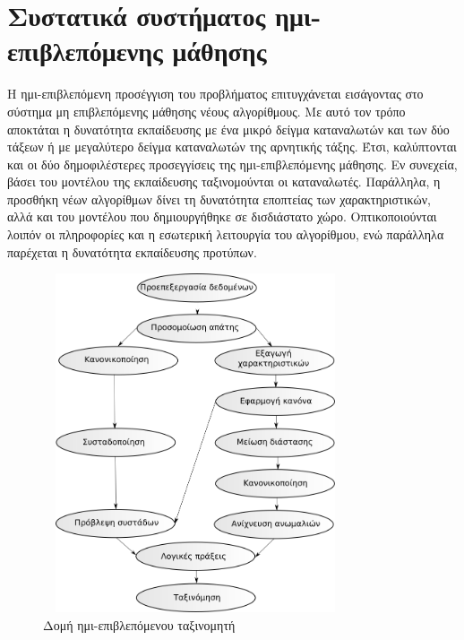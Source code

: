 \section{Συστατικά συστήματος ημι-επιβλεπόμενης μάθησης}
Η ημι-επιβλεπόμενη προσέγγιση του προβλήματος επιτυγχάνεται εισάγοντας στο σύστημα μη επιβλεπόμενης μάθησης νέους αλγορίθμους. Με αυτό τον τρόπο αποκτάται η δυνατότητα εκπαίδευσης με ένα μικρό δείγμα καταναλωτών και των δύο τάξεων ή με μεγαλύτερο δείγμα καταναλωτών της αρνητικής τάξης. Έτσι, καλύπτονται και οι δύο δημοφιλέστερες προσεγγίσεις της ημι-επιβλεπόμενης μάθησης. Εν συνεχεία, βάσει του μοντέλου της εκπαίδευσης ταξινομούνται οι καταναλωτές. Παράλληλα, η προσθήκη νέων αλγορίθμων δίνει τη δυνατότητα εποπτείας των χαρακτηριστικών, αλλά και του μοντέλου που δημιουργήθηκε σε δισδιάστατο χώρο. Οπτικοποιούνται λοιπόν οι πληροφορίες και η εσωτερική λειτουργία του αλγορίθμου, ενώ παράλληλα παρέχεται η δυνατότητα εκπαίδευσης προτύπων.\par
\begin{figure}[ht!]
\centering
 \includegraphics[width=90mm, height=100mm]{../../plots/systems/semi_supervised.png}
 \caption{Δομή ημι-επιβλεπόμενου ταξινομητή}
\label{fig:semisupervisedsystem}
 \end{figure}

